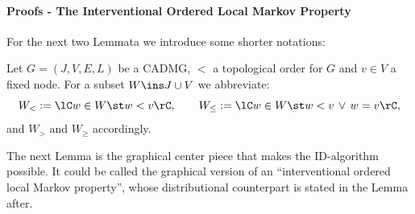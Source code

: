 \paragraph{Proofs - The Interventional Ordered Local Markov Property}\hfill

For the next two Lemmata we introduce some shorter notations:

\begin{Not}
    Let $G=(J,V,E,L)$ be a CADMG, $<$ a topological order for $G$ and $v \in V$ a fixed node.
    For a subset $W \ins J \cup V$ we abbreviate:
    \[ W_<:=\lC w \in W \st w < v \rC, \qquad W_\le:=\lC w \in W \st w < v \,\lor\, w=v \rC, \]
    and $W_>$ and $W_\ge$ accordingly.
\end{Not}

The next Lemma is the graphical center piece that makes the ID-algorithm possible.
It could be called the graphical version of an ``interventional ordered local Markov property'',
whose distributional counterpart is stated in the Lemma after.


